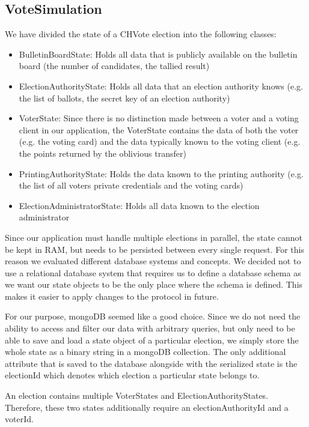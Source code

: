 \subsection{VoteSimulation}
We have divided the state of a CHVote election into the following classes:
\begin{itemize}
	\item BulletinBoardState: Holds all data that is publicly available on the bulletin board (the number of candidates, the tallied result)
	\item ElectionAuthorityState: Holds all data that an election authority knows (e.g. the list of ballots, the secret key of an election authority)
	\item VoterState: Since there is no distinction made between a voter and a voting client in our application, the VoterState contains the data of both the voter (e.g. the voting card) and the data typically known to the voting client (e.g. the points returned by the oblivious transfer)
	\item PrintingAuthorityState: Holds the data known to the printing authority (e.g. the list of all voters private credentials and the voting cards)
	\item ElectionAdministratorState: Holds all data known to the election administrator 
\end{itemize}

Since our application must handle multiple elections in parallel, the state cannot be kept in RAM, but needs to be persisted between every single request. For this reason we evaluated different database systems and concepts. We decided not to use a relational database system that requires us to define a database schema as we want our state objects to be the only place where the schema is defined. This makes it easier to apply changes to the protocol in future. 

For our purpose, mongoDB seemed like a good choice. Since we do not need the ability to access and filter our data with arbitrary queries, but only need to be able to save and load a state object of a particular election, we simply store the whole state as a binary string in a mongoDB collection. The only additional attribute that is saved to the database alongside with the serialized state is the electionId which denotes which election a particular state belongs to. 

An election contains multiple VoterStates and ElectionAuthorityStates. Therefore, these two states additionally require an electionAuthorityId and a voterId.

